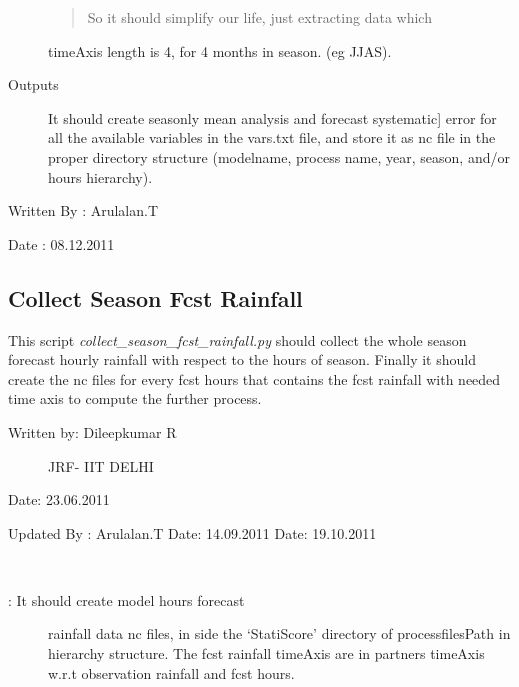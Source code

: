 \documentclass[letterpaper,10pt,english]{sphinxmanual}
\begin{document}
\begin{fulllineitems}
\begin{description}
\begin{quote}
So it should simplify our life, just extracting data which
\end{quote}

timeAxis length is 4, for 4 months in season. (eg JJAS).

\item[{Outputs}] \leavevmode{[}It should create seasonly mean analysis and forecast systematic{]}
error for all the available variables in the vars.txt file,
and store it as nc file in the proper directory structure
(modelname, process name, year, season, and/or hours hierarchy).

\end{description}

Written By : Arulalan.T

Date : 08.12.2011

\end{fulllineitems}



\subsection{Collect Season Fcst Rainfall}
\label{diagnosis:collect-season-fcst-rainfall}
This script \emph{collect\_season\_fcst\_rainfall.py} should collect the whole season forecast hourly rainfall with respect to the hours of season.
Finally it should create the nc files for every fcst hours that contains the fcst rainfall with needed time axis to compute the further process.
\label{diagnosis:module-collect_season_fcst_rainfall}\label{diagnosis:module-collect_season_fcst_rainfall.py}\begin{description}
\item[{Written by: Dileepkumar R}] \leavevmode
JRF- IIT DELHI

\end{description}

Date: 23.06.2011

Updated By : Arulalan.T
Date: 14.09.2011
Date: 19.10.2011

\begin{fulllineitems}
\label{diagnosis:collect_season_fcst_rainfall.createSeaonFcstRainfallData}~\begin{description}
\item[{: It should create model hours forecast}] \leavevmode
rainfall data nc files, in side the `StatiScore' directory of
processfilesPath in hierarchy structure. The fcst rainfall
timeAxis are in partners timeAxis w.r.t observation rainfall and
fcst hours.

\end{description}

\end{fulllineitems}
\end{document}
